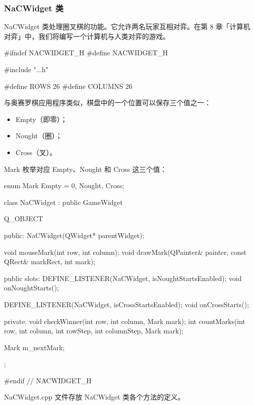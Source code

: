 \subsubsection{NaCWidget 类}

NaCWidget 类处理圈叉棋的功能。它允许两名玩家互相对弈。在第 8 章「计算机对弈」中，我们将编写一个计算机与人类对弈的游戏。

\medskip{}

\begin{codebox}
#ifndef NACWIDGET_H
#define NACWIDGET_H

#include "..\MainWindow\GameWidget.h"

#define ROWS    26
#define COLUMNS 26
\end{codebox}

与奥赛罗棋应用程序类似，棋盘中的一个位置可以保存三个值之一：

\begin{itemize}
\item Empty（即零）；
\item Nought（圈）；
\item Cross（叉）。
\end{itemize}

Mark 枚举对应 Empty、Nought 和 Cross 这三个值：

\begin{codebox}
enum Mark {Empty = 0, Nought, Cross};

class NaCWidget : public GameWidget {
  Q_OBJECT

  public:
    NaCWidget(QWidget* parentWidget);

    void mouseMark(int row, int column);
    void drawMark(QPainter& painter,
                  const QRect& markRect, int mark);

  public slots:
    DEFINE_LISTENER(NaCWidget, isNoughtStartsEnabled);
    void onNoughtStarts();

    DEFINE_LISTENER(NaCWidget, isCrossStartsEnabled);
    void onCrossStarts();

  private:
    void checkWinner(int row, int column, Mark mark);
    int countMarks(int row, int column, int rowStep,
                   int columnStep, Mark mark);

    Mark m_nextMark;
};

#endif // NACWIDGET_H
\end{codebox}

NaCWidget.cpp 文件存放 NaCWidget 类各个方法的定义。

\medskip{}

